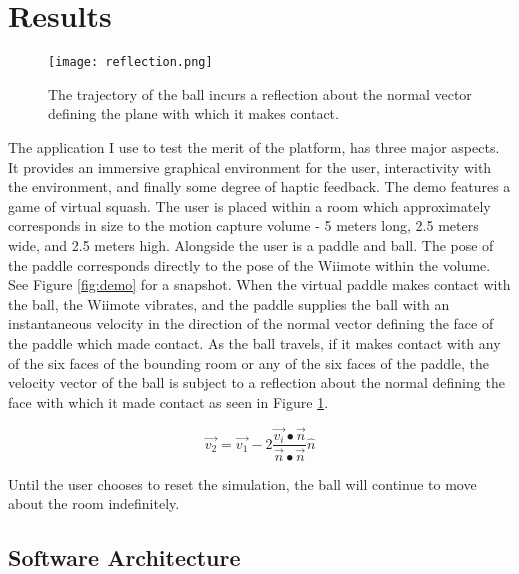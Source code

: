 \section{Results}
\label{sec:results}

\begin{figure}[b!]
\centering
\texttt{[image: reflection.png]}
\caption{The trajectory of the ball incurs a reflection about the normal
vector defining the plane with which it makes contact.}
\label{fig:reflection}
\end{figure}

The application I use to test the merit of the platform, has three major
aspects. It provides an immersive graphical environment for the user,
interactivity with the environment, and finally some degree of haptic feedback.
The demo features a game of virtual squash. The user is placed within a room
which approximately corresponds in size to the motion capture volume - 5 meters
long, 2.5 meters wide, and 2.5 meters high. Alongside the user is a paddle and
ball. The pose of the paddle corresponds directly to the pose of the Wiimote
within the volume. See Figure \ref{fig:demo} for a snapshot.  When the virtual
paddle makes contact with the ball, the Wiimote vibrates, and the paddle
supplies the ball with an instantaneous velocity in the direction of the normal
vector defining the face of the paddle which made contact.  As the ball
travels, if it makes contact with any of the six faces of the bounding room or
any of the six faces of the paddle, the velocity vector of the ball is subject
to a reflection about the normal defining the face with which it made contact
as seen in Figure \ref{fig:reflection}. 

\[
\vec{v_{2}} = \vec{v_{1}} - 2 \frac{\vec{v_{i}} \bullet \vec{n}}{\vec{n} \bullet \vec{n}} \hat{n}
\]

Until the user chooses to reset the simulation, the ball will continue to 
move about the room indefinitely.

\subsection{Software Architecture}

